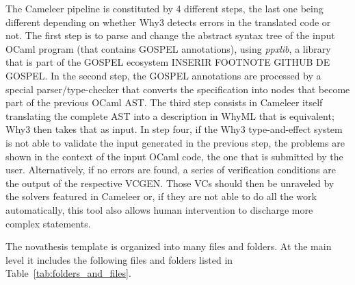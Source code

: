 The Cameleer pipeline is constituted by 4 different steps, the last one being different depending on whether Why3 detects errors in the translated code or not.
The first step is to parse and change the abstract syntax tree of the input OCaml program (that contains GOSPEL annotations), using \emph{ppxlib}, a library that is part of the GOSPEL ecosystem INSERIR FOOTNOTE GITHUB DE GOSPEL.
In the second step, the GOSPEL annotations are processed by a special parser/type-checker that converts the specification into nodes that become part of the previous OCaml AST.
The third step consists in Cameleer itself translating the complete AST into a description in WhyML that is equivalent; Why3 then takes that as input.
In step four, if the Why3 type-and-effect system is not able to validate the input generated in the previous step, the problems are shown in the context of the input OCaml code, the one that is submitted by the user. 
Alternatively, if no errors are found, a series of verification conditions are the output of the respective VCGEN.
Those VCs should then be unraveled by the solvers featured in Cameleer or, if they are not able to do all the work automatically, this tool also allows human intervention to discharge more complex statements.






















\iffalse
The \gls{novathesis} template is organized into many files and folders. At the main level it includes the following files and folders listed in Table~\ref{tab:folders_and_files}.

\newcommand{\accessAllowed}{\texttt{[image: access\_allowed]}}
\newcommand{\accessForbiden}{\texttt{[image: dont\_touch]}}
\newcommand{\File}{\texttt{[image: file]}}
\newcommand{\Folder}{\texttt{[image: folder]}}


